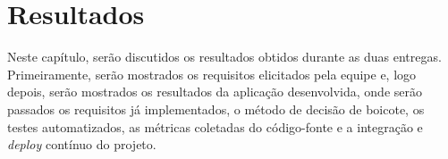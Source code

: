 \chapter[Resultados]{Resultados}
\label{chap:result}

Neste capítulo, serão discutidos os resultados obtidos durante as duas entregas. Primeiramente, serão mostrados os requisitos elicitados pela equipe e, logo depois, serão mostrados os resultados da aplicação desenvolvida, onde serão passados os requisitos já implementados, o método de decisão de boicote, os testes automatizados, as métricas coletadas do código-fonte e a integração e \textit{deploy} contínuo do projeto.



